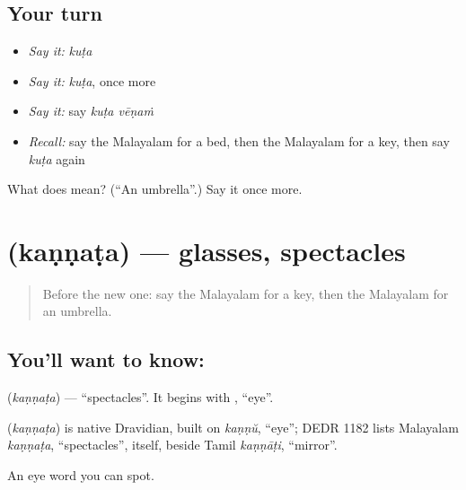 \subsection*{Your turn}
\begin{itemize}
\raggedright
  \item \emph{Say it:} \emph{kuṭa}
  \item \emph{Say it:} \emph{kuṭa}, once more
  \item \emph{Say it:} say \emph{kuṭa vēṇaṁ}
  \item \emph{Recall:} say the Malayalam for a bed, then the Malayalam for a key, then say \emph{kuṭa} again
\end{itemize}

\begin{tcolorbox}[breakable,colback=teal!4,colframe=teal!35!black,title={Before you move on}]
What does  mean? (\textquotedblleft{}An umbrella\textquotedblright{}.) Say it once more.
\end{tcolorbox}
\section[\texorpdfstring{\ml{കണ്ണട} (kaṇṇaṭa)}{കണ്ണട (kaṇṇaṭa)}]{ (kaṇṇaṭa) — glasses, spectacles}

\label{lesson:ML-C129-glasses}



\begin{quote}
Before the new one: say the Malayalam for a key, then the Malayalam for an umbrella.
\end{quote}

\subsection*{You'll want to know: }
\textbf{} (\emph{kaṇṇaṭa}) — \textquotedblleft{}spectacles\textquotedblright{}. It begins with \textbf{}, \textquotedblleft{}eye\textquotedblright{}.

\begin{cousinweb}
\textbf{} (\emph{kaṇṇaṭa}) is native Dravidian, built on \emph{kaṇṇŭ}, \textquotedblleft{}eye\textquotedblright{}; DEDR 1182 lists Malayalam \emph{kaṇṇaṭa}, \textquotedblleft{}spectacles\textquotedblright{}, itself, beside Tamil \emph{kaṇṇāṭi}, \textquotedblleft{}mirror\textquotedblright{}.
\end{cousinweb}

\begin{grammarlens}[title={What you've built}]
An eye word you can spot.
\end{grammarlens}

